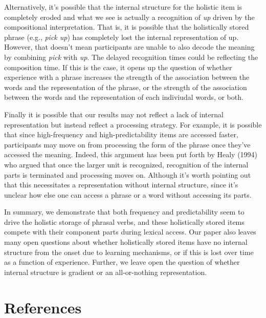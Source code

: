 \documentclass[
  man,floatsintext]{apa6}
\begin{document}
Alternatively, it's possible that the internal structure for the holistic item is completely eroded and what we see is actually a recognition of \emph{up} driven by the compositional interpretation. That is, it is possible that the holistically stored phrase (e.g., \emph{pick up}) has completely lost the internal representation of up. However, that doesn't mean participants are unable to also decode the meaning by combining \emph{pick} with \emph{up}. The delayed recognition times could be reflecting the composition time. If this is the case, it opens up the question of whether experience with a phrase increases the strength of the association between the words and the representation of the phrase, or the strength of the association between the words and the representation of each indiviudal words, or both.

Finally it is possible that our results may not reflect a lack of internal representation but instead reflect a processing strategy. For example, it is possible that since high-frequency and high-predictability items are accessed faster, participants may move on from processing the form of the phrase once they've accessed the meaning. Indeed, this argument has been put forth by Healy (1994) who argued that once the larger unit is recognized, recognition of the internal parts is terminated and processing moves on. Although it's worth pointing out that this necessitates a representation without internal structure, since it's unclear how else one can access a phrase or a word without accessing its parts.

In summary, we demonstrate that both frequency and predictability seem to drive the holistic storage of phrasal verbs, and these holistically stored items compete with their component parts during lexical access. Our paper also leaves many open questions about whether holistically stored items have no internal structure from the onset due to learning mechanisms, or if this is lost over time as a function of experience. Further, we leave open the question of whether internal structure is gradient or an all-or-nothing representation.

\newpage

\hypertarget{references}{%
\section{References}\label{references}}
\end{document}
